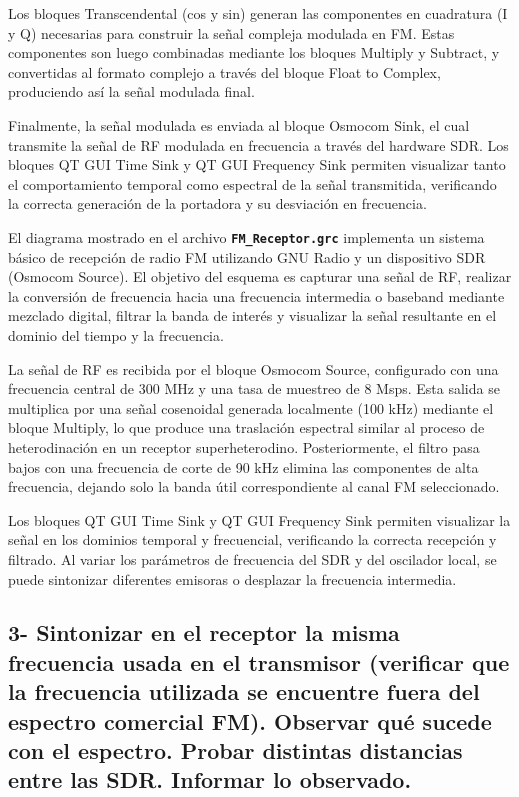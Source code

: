 Los bloques Transcendental (cos y sin) generan las componentes en cuadratura (I y Q) necesarias para construir la señal compleja modulada en FM. Estas componentes son luego combinadas mediante los bloques Multiply y Subtract, y convertidas al formato complejo a través del bloque Float to Complex, produciendo así la señal modulada final.

Finalmente, la señal modulada es enviada al bloque Osmocom Sink, el cual transmite la señal de RF modulada en frecuencia a través del hardware SDR. Los bloques QT GUI Time Sink y QT GUI Frequency Sink permiten visualizar tanto el comportamiento temporal como espectral de la señal transmitida, verificando la correcta generación de la portadora y su desviación en frecuencia.

El diagrama mostrado en el archivo \textbf{\texttt{FM\_Receptor.grc}}  implementa un sistema básico de recepción de radio FM utilizando GNU Radio y un dispositivo SDR (Osmocom Source). El objetivo del esquema es capturar una señal de RF, realizar la conversión de frecuencia hacia una frecuencia intermedia o baseband mediante mezclado digital, filtrar la banda de interés y visualizar la señal resultante en el dominio del tiempo y la frecuencia.

La señal de RF es recibida por el bloque Osmocom Source, configurado con una frecuencia central de 300 MHz y una tasa de muestreo de 8 Msps. Esta salida se multiplica por una señal cosenoidal generada localmente (100 kHz) mediante el bloque Multiply, lo que produce una traslación espectral similar al proceso de heterodinación en un receptor superheterodino. Posteriormente, el filtro pasa bajos con una frecuencia de corte de 90 kHz elimina las componentes de alta frecuencia, dejando solo la banda útil correspondiente al canal FM seleccionado.

Los bloques QT GUI Time Sink y QT GUI Frequency Sink permiten visualizar la señal en los dominios temporal y frecuencial, verificando la correcta recepción y filtrado. Al variar los parámetros de frecuencia del SDR y del oscilador local, se puede sintonizar diferentes emisoras o desplazar la frecuencia intermedia.

\subsection*{3- Sintonizar en el receptor la misma frecuencia usada en el transmisor (verificar que la frecuencia utilizada se encuentre fuera del espectro comercial FM). Observar qué sucede con el espectro. Probar distintas distancias entre las SDR. Informar lo observado.}

